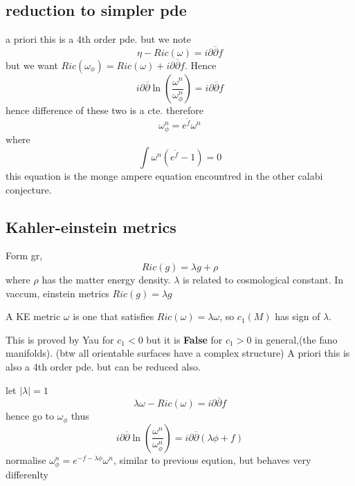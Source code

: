 \subsection{reduction to simpler pde} %
\label{sub:reduction_to_simpler_pde}
a priori this is a 4th order pde.
but we note
\begin{equation}
    \eta - Ric(\omega) = i \partial \overline{\partial} f
\end{equation}
but we want $Ric(\omega_\phi) = Ric(\omega) + i \partial \overline{\partial} f$.
Hence
\begin{equation}
    i \partial \overline{\partial} \ln(\frac{\omega^n}{\omega^n_\phi}) = i \partial \overline{\partial} f
\end{equation}
hence difference of these two is a cte.
therefore
\begin{equation}
    \omega_\phi^n = e^{\tilde{f} }\omega^n
\end{equation}
where 
\begin{equation}
    \int \omega^n (e^{\tilde{f}}-1) = 0
\end{equation}
this equation is the monge ampere equation encountred in the other calabi conjecture.
\subsection{Kahler-einstein metrics} %
\label{sub:kahler_einstein_metrics}

Form gr,
\begin{equation}
    Ric(g) = \lambda g + \rho
\end{equation}
where $\rho$ has the matter energy density. $\lambda$ is related to cosmological constant.
In vaccum, einstein metrics $Ric(g) = \lambda g$

A KE metric $\omega$ is one that satisfies $Ric(\omega) = \lambda \omega$, so 
$c_1(M)$ has sign of $\lambda$.


This is proved by Yau for $c_1 <0$ but it is \textbf{False} for $c_1 >0$ in general,(the fano manifolds).
(btw all orientable surfaces have a complex structure)
A priori this is also a 4th order pde. but can be reduced also.

let $|\lambda| = 1$
\begin{equation}
    \lambda \omega - Ric(\omega) = i \partial \overline{\partial} f
\end{equation}
hence go to $\omega_\phi$
thus
\begin{equation}
    i \partial \overline{\partial} \ln(\frac{\omega^n}{\omega^n_\phi}) = i \partial \overline{\partial} (\lambda \phi + f)
\end{equation}
normalise
$\omega_\phi^n = e^{-f - \lambda \phi} \omega^n $, similar to previous eqution, but behaves very differenlty

